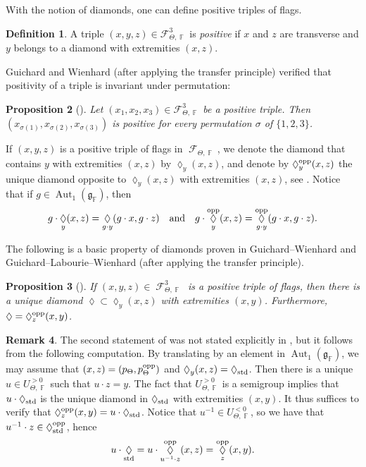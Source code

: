 \documentclass{amsart}
\theoremstyle{plain}
\newtheorem{proposition}{Proposition}[section]
\theoremstyle{definition}
\newtheorem{definition}[proposition]{Definition}
\newtheorem{remark}[proposition]{Remark}
\DeclareMathOperator{\Aut}{Aut}
\DeclareMathOperator{\Diam}{\lozenge}
\DeclareMathOperator{\Fc}{\mathcal{F}}
\DeclareMathOperator{\Fb}{{\mathbb{F}}}
\newcommand{\opp}{\textnormal{opp}}
\newcommand{\std}{\textnormal{std}}
\newcommand{\1}{\mathbf{1}}
\begin{document}
With the notion of diamonds, one can define positive triples of flags.

\begin{definition}
A triple $(x,y,z)\in \mathcal F_{\Theta,\Fb}^3$ is \emph{positive} if $x$ and $z$ are transverse and $y$ belongs to a diamond with extremities $(x,z)$. 
\end{definition}

Guichard and Wienhard \cite{GW} (after applying the transfer principle) verified that positivity of a triple is invariant under permutation:
\begin{proposition}[{\cite[Proposition 13.15]{guichard2025generalizing}}]\label{permutation positive triple}
   Let $(x_1,x_2, x_3)\in \mathcal F_{\Theta,\Fb}^3$ be a positive triple. Then $(x_{\sigma(1)}, x_{\sigma(2)}, x_{\sigma(3)})$ is positive for every permutation $\sigma$ of $\{1,2,3\}$.
\end{proposition}

If $(x,y,z)$ is a positive triple of flags in $\Fc_{\Theta,\Fb}$, we denote the diamond that contains $y$ with extremities $(x,z)$ by $\Diam_y(x,z)$, and denote by $\Diam_y^{\rm opp}(x,z)$ the unique diamond opposite to $\Diam_y(x,z)$ with extremities $(x,z)$, see . Notice that if $g\in \Aut_1(\mathfrak g_{\Fb})$, then 
\[g\cdot\Diam_y(x,z)=\Diam_{g\cdot y}(g\cdot x,g\cdot z)\quad\text{and}\quad g\cdot\Diam_y^{\rm opp}(x,z)=\Diam_{g\cdot y}^{\rm opp}(g\cdot x,g\cdot z).\]



The following is a basic property of diamonds proven in Guichard--Wienhard \cite{guichard2025generalizing} and Guichard--Labourie--Wienhard \cite{GLW} (after applying the transfer principle).

\begin{proposition}[{\cite[Propositions 13.7]{guichard2025generalizing}}]\label{proposition: opposite diamonds}
If $(x,y,z)\in\Fc_{\Theta,\Fb}^3$ is a positive triple of flags, then there is a unique diamond $\Diam \subset \Diam_y(x,z)$ with extremities $(x,y)$. Furthermore, $\Diam=\Diam_z^{\rm opp}(x,y)$. 
\end{proposition}

\begin{remark}
The second statement of  was not stated explicitly in {\cite[Propositions 13.7]{guichard2025generalizing}}, but it follows from the following computation. By translating by an element in $\Aut_1(\mathfrak g_{\Fb})$, we may assume that $(x,z)=(p_\Theta,p_\Theta^{\rm opp})$ and $\Diam_y(x,z)=\Diam  _{\std}$. Then there is a unique $u\in U_{\Theta,\Fb}^{>0}$ such that $u\cdot z=y$. The fact that $U_{\Theta,\Fb}^{>0}$ is a semigroup implies that $u\cdot\Diam_{\std}$ is the unique diamond in $\Diam_{\std}$ with extremities $(x,y)$. It thus suffices to verify that $\Diam_z^{\rm opp}(x,y)=u\cdot\Diam_{\std}$. Notice that $u^{-1}\in U_{\Theta,\Fb}^{<0}$, so we have that $u^{-1} \cdot z \in \Diam_\std^\opp$, hence
\[u\cdot \Diam_\std= u\cdot \Diam^\opp_{u^{-1}\cdot z}(x, z)=\Diam_z^{\rm opp}(x,y).\]
\end{remark}
\end{document}
